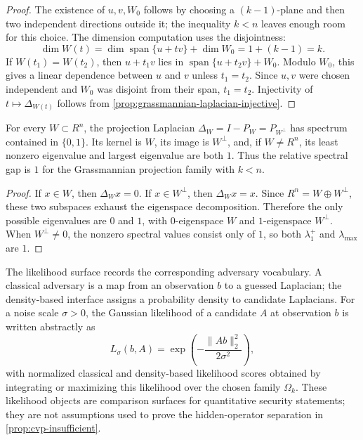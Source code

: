 \begin{proof}
  The existence of \(u,v,W_0\) follows by choosing a \((k-1)\)-plane and then
  two independent directions outside it; the inequality \(k<n\) leaves enough
  room for this choice. The dimension computation uses the disjointness:
  \[
    \dim W(t)
    =
    \dim\operatorname{span}\{u+tv\}+\dim W_0
    =
    1+(k-1)=k.
  \]
  If \(W(t_1)=W(t_2)\), then \(u+t_1v\) lies in
  \(\operatorname{span}\{u+t_2v\}+W_0\). Modulo \(W_0\), this gives a linear
  dependence between \(u\) and \(v\) unless \(t_1=t_2\). Since \(u,v\) were
  chosen independent and \(W_0\) was disjoint from their span, \(t_1=t_2\).
  Injectivity of \(t\mapsto\Delta_{W(t)}\) follows from
  \cref{prop:grassmannian-laplacian-injective}.
\end{proof}

\begin{proposition}\label{prop:projection-spectrum-gap}
  For every \(W\subset R^n\), the projection Laplacian
  \(\Delta_W=I-P_W=P_{W^\perp}\) has spectrum contained in \(\{0,1\}\).
  Its kernel is \(W\), its image is \(W^\perp\), and, if
  \(W\ne R^n\), its least nonzero eigenvalue and largest eigenvalue are both
  \(1\). Thus the relative spectral gap is \(1\) for the Grassmannian
  projection family with \(k<n\).
\end{proposition}

\begin{proof}
  If \(x\in W\), then \(\Delta_Wx=0\). If \(x\in W^\perp\), then
  \(\Delta_Wx=x\). Since \(R^n=W\oplus W^\perp\), these two subspaces exhaust
  the eigenspace decomposition. Therefore the only possible eigenvalues are
  \(0\) and \(1\), with \(0\)-eigenspace \(W\) and \(1\)-eigenspace
  \(W^\perp\). When \(W^\perp\ne 0\), the nonzero spectral values consist
  only of \(1\), so both \(\lambda_1^+\) and \(\lambda_{\max}\) are \(1\).
\end{proof}

The likelihood surface records the corresponding adversary vocabulary. A
classical adversary is a map from an observation \(b\) to a guessed Laplacian;
the density-based interface assigns a probability density to candidate
Laplacians. For a
noise scale \(\sigma>0\), the Gaussian likelihood of a candidate \(A\) at
observation \(b\) is written abstractly as
\[
  L_\sigma(b,A)
  =
  \exp\left(-\frac{\|A b\|_2^2}{2\sigma^2}\right),
\]
with normalized classical and density-based likelihood scores obtained by
integrating or maximizing this likelihood over the chosen family
\(\Omega_k\). These likelihood objects are comparison surfaces for quantitative
security statements; they are not assumptions used to prove the hidden-operator
separation in \cref{prop:cvp-insufficient}.

